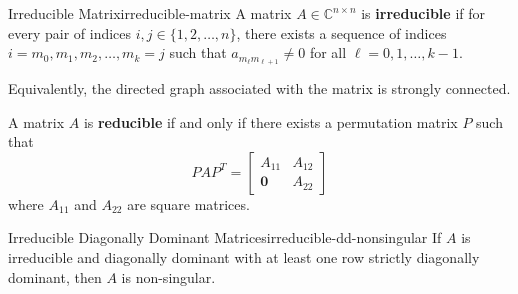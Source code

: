 \begin{definition}{Irreducible Matrix}{irreducible-matrix}
    A matrix $A \in \mathbb{C}^{n \times n}$ is \textbf{irreducible} if for every pair of indices $i, j \in \{1, 2, \ldots, n\}$, there exists a sequence of indices $i = m_0, m_1, m_2, \ldots, m_k = j$ such that $a_{m_\ell m_{\ell+1}} \neq 0$ for all $\ell = 0, 1, \ldots, k-1$.

    Equivalently, the directed graph associated with the matrix is strongly connected.
\end{definition}


A matrix $A$ is \textbf{reducible} if and only if there exists a permutation matrix $P$ such that
\begin{equation}
    P A P^T = \begin{bmatrix}
        A_{11}     & A_{12} \\
        \mathbf{0} & A_{22}
    \end{bmatrix}
\end{equation}
where $A_{11}$ and $A_{22}$ are square matrices.

\begin{theorem}{Irreducible Diagonally Dominant Matrices}{irreducible-dd-nonsingular}
    If $A$ is irreducible and diagonally dominant with at least one row strictly diagonally dominant, then $A$ is non-singular.
\end{theorem}

